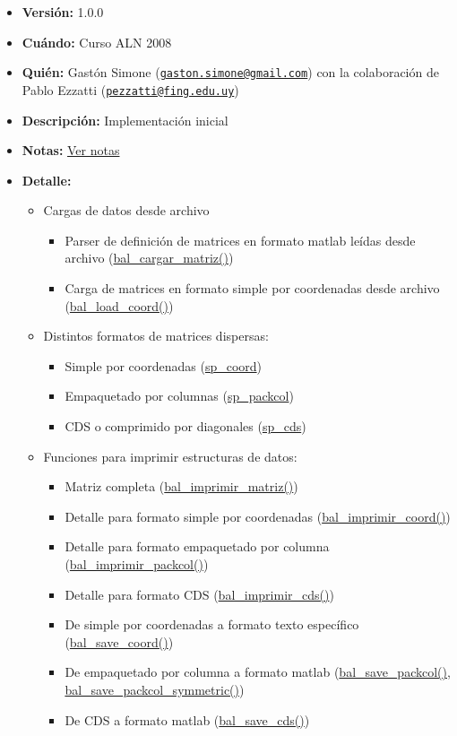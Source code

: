\begin{itemize}
\item {\bf Versión:} 1.0.0 \item {\bf Cuándo:} Curso ALN 2008 \item {\bf Quién:} Gastón Simone (\href{mailto:gaston.simone@gmail.com}{\tt gaston.simone@gmail.com}) con la colaboración de Pablo Ezzatti (\href{mailto:pezzatti@fing.edu.uy}{\tt pezzatti@fing.edu.uy}) \item {\bf Descripción:} Implementación inicial \item {\bf Notas:} \hyperlink{notasver_notasver1_0_0}{Ver notas} \item {\bf Detalle:} \begin{itemize}
\item Cargas de datos desde archivo \begin{itemize}
\item Parser de definición de matrices en formato matlab leídas desde archivo (\hyperlink{bal_8c_5fa9afcb6f46fadec6d601f11592ebc9}{bal\_\-cargar\_\-matriz()}) \item Carga de matrices en formato simple por coordenadas desde archivo (\hyperlink{bal_8c_1e8a293081b94602060a2f757e92a8ce}{bal\_\-load\_\-coord()}) \end{itemize}
\item Distintos formatos de matrices dispersas: \begin{itemize}
\item Simple por coordenadas (\hyperlink{structsp__coord}{sp\_\-coord}) \item Empaquetado por columnas (\hyperlink{structsp__packcol}{sp\_\-packcol}) \item CDS o comprimido por diagonales (\hyperlink{structsp__cds}{sp\_\-cds}) \end{itemize}
\item Funciones para imprimir estructuras de datos: \begin{itemize}
\item Matriz completa (\hyperlink{bal_8c_001bc810dfe24d78c6ee465351471ca7}{bal\_\-imprimir\_\-matriz()}) \item Detalle para formato simple por coordenadas (\hyperlink{bal_8c_fb2e0eb90b54ac0b083d42f1d38d45ac}{bal\_\-imprimir\_\-coord()}) \item Detalle para formato empaquetado por columna (\hyperlink{bal_8c_5c7bdb5d92a964b7e4cc66d8058e6fed}{bal\_\-imprimir\_\-packcol()}) \item Detalle para formato CDS (\hyperlink{bal_8c_0098b5496a5f2131a34c197bbc9ba57a}{bal\_\-imprimir\_\-cds()}) \item De simple por coordenadas a formato texto específico (\hyperlink{bal_8c_abba0c987c1cd21f99ae3ef4a5fca7ac}{bal\_\-save\_\-coord()}) \item De empaquetado por columna a formato matlab (\hyperlink{bal_8c_23df03ad23589aefe5103d463d55ff8c}{bal\_\-save\_\-packcol()}, \hyperlink{bal_8c_5ae3c23f89da32858f1420e32d35ccdc}{bal\_\-save\_\-packcol\_\-symmetric()}) \item De CDS a formato matlab (\hyperlink{bal_8c_5928b3ea635bf59c0a99e5c835c06668}{bal\_\-save\_\-cds()}) \end{itemize}

\end{itemize}
\end{itemize}

